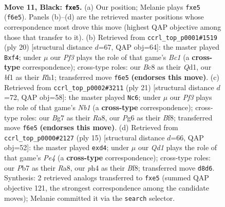 \documentclass[11pt]{article}
\begin{document}
\clearpage

\begin{figure}[p]\centering
\begin{subfigure}{0.46\textwidth}\centering
\resizebox{\linewidth}{!}{%
\newchessgame
\chessboard[
  setfen={rnbqk2r/pp4bp/5pp1/4P3/3PP1PP/8/P7/R1BQKBNR b KQkq - 0 11},
  showmover=false,
  pgfstyle=straightmove, color=movearrow, markmove={f6-e5}
]}
\caption{}
\end{subfigure}\hfill
\begin{subfigure}{0.46\textwidth}\centering
\resizebox{\linewidth}{!}{%
\newchessgame
\chessboard[
  setfen={r1bqk2r/ppp1npp1/8/2p4p/2P2p2/3P2P1/PP3PBP/R1BQK2R w KQkq - 0 11},
  showmover=false,
  pgfstyle=straightmove, color=movearrow, markmove={c1-f4}
]}
\caption{}
\end{subfigure}
\\[4pt]
\begin{subfigure}{0.46\textwidth}\centering
\resizebox{\linewidth}{!}{%
\newchessgame
\chessboard[
  setfen={rnbqkb1r/1p4pp/p3p3/6P1/3PpB2/2P5/PP5P/R2QKBNR b KQkq - 0 11},
  showmover=false,
  pgfstyle=straightmove, color=movearrow, markmove={b8-c6}
]}
\caption{}
\end{subfigure}\hfill
\begin{subfigure}{0.46\textwidth}\centering
\resizebox{\linewidth}{!}{%
\newchessgame
\chessboard[
  setfen={rn1qkb1r/pbp2ppp/1p6/4p3/2BPP3/2P2P2/P5PP/R1BQK1NR b KQkq - 1 8},
  showmover=false,
  pgfstyle=straightmove, color=movearrow, markmove={e5-d4}
]}
\caption{}
\end{subfigure}
\caption{\textbf{Move 11, Black: \texttt{fxe5}.} (a) Our position; Melanie plays \texttt{fxe5} (\texttt{f6e5}). Panels (b)--(d) are the retrieved master positions whose correspondence most drove this move (highest QAP objective among those that transfer to it). (b) Retrieved from \texttt{ccrl\_top\_p0001\#1519} (ply 20) [structural distance $d$=67, QAP obj=64]: the master played \texttt{Bxf4}; under $\mu$ our \emph{Pf3} plays the role of that game's \emph{Bc1} (a \textbf{cross-type} correspondence); cross-type roles: our \emph{B}c8 as their \emph{Q}d1, our \emph{b}f1 as their \emph{R}h1; transferred move \texttt{f6e5} \textbf{(endorses this move)}. (c) Retrieved from \texttt{ccrl\_top\_p0002\#3211} (ply 21) [structural distance $d$=72, QAP obj=58]: the master played \texttt{Nc6}; under $\mu$ our \emph{Pf3} plays the role of that game's \emph{Nb1} (a \textbf{cross-type} correspondence); cross-type roles: our \emph{B}g7 as their \emph{R}a8, our \emph{P}g6 as their \emph{B}f8; transferred move \texttt{f6e5} \textbf{(endorses this move)}. (d) Retrieved from \texttt{ccrl\_top\_p0000\#2127} (ply 15) [structural distance $d$=66, QAP obj=52]: the master played \texttt{exd4}; under $\mu$ our \emph{Qd1} plays the role of that game's \emph{Pe4} (a \textbf{cross-type} correspondence); cross-type roles: our \emph{P}b7 as their \emph{R}a8, our \emph{p}h4 as their \emph{B}f8; transferred move \texttt{d8d6}. Synthesis: 2 retrieved analogs transferred to \texttt{fxe5} (summed QAP objective 121, the strongest correspondence among the candidate moves); Melanie committed it via the \texttt{search} selector.}
\label{fig:thought-m21}
\end{figure}
\end{document}
